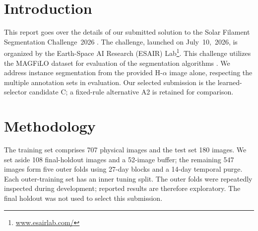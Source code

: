 \documentclass[sigconf]{acmart}
\begin{document}


\section{Introduction}
    This report goes over the details of our submitted solution to the Solar Filament Segmentation Challenge~2026 \cite{filament-segmentation-2026}. The challenge, launched on July~10,~2026, is organized by the Earth-Space AI Research (ESAIR) Lab\footnote{\href{https://www.esairlab.com/home}{www.esairlab.com/}}. This challenge utilizes the MAGFiLO dataset for evaluation of the segmentation algorithms \cite{ahmadzadeh2024dataset}. We address instance segmentation from the provided H-$\alpha$ image alone, respecting the multiple annotation sets in evaluation. Our selected submission is the learned-selector candidate C; a fixed-rule alternative A2 is retained for comparison.


\section{Methodology}\label{sec:methodology}
The training set comprises 707 physical images and the test set 180 images. We set aside 108 final-holdout images and a 52-image buffer; the remaining 547 images form five outer folds using 27-day blocks and a 14-day temporal purge. Each outer-training set has an inner tuning split. The outer folds were repeatedly inspected during development; reported results are therefore exploratory. The final holdout was not used to select this submission.
\end{document}
